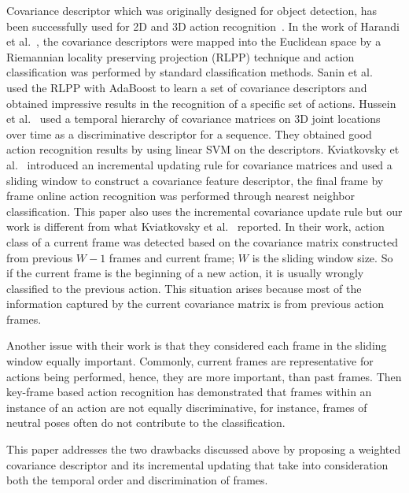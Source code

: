\documentclass[sigconf]{acmart}
\begin{document}
Covariance descriptor which was originally designed for object detection, has been successfully used for 2D and 3D action recognition~\cite{harandi2012kernel,hussein2013human,kviatkovsky2014online,sanin2013spatio}. In the work of Harandi et al.~\cite{harandi2012kernel}, the covariance descriptors were mapped into the Euclidean space by a Riemannian locality preserving projection (RLPP) technique and action classification was performed by standard classification methods. Sanin et al.~\cite{sanin2013spatio} used the RLPP with AdaBoost to learn a set of covariance descriptors and obtained impressive results in the recognition of a specific set of actions. Hussein et al.~\cite{hussein2013human} used a temporal hierarchy of covariance matrices on 3D joint locations over time as a discriminative descriptor for a sequence. They obtained good action recognition results by using linear SVM on the descriptors. Kviatkovsky et al.~\cite{kviatkovsky2014online} introduced an incremental updating rule for covariance matrices and used a sliding window to construct a covariance feature descriptor, the final frame by frame online action recognition was performed through nearest neighbor classification. This paper also uses the incremental covariance update rule but our work is different from what Kviatkovsky et al.~\cite{kviatkovsky2014online} reported. In their work, action class of a current frame was detected based on the covariance matrix constructed from previous $W-1$ frames and current frame; $W$ is the sliding window size. So if the current frame is the beginning of a new action, it is usually wrongly classified to the previous action. This situation arises because most of the information captured by the current covariance matrix is from previous action frames.

Another issue with their work is that they considered each frame in the sliding window equally important. Commonly,  current frames are representative for actions being performed, hence, they are more important, than past frames. Then key-frame based action recognition has demonstrated that frames within an instance of an action are not equally discriminative, for instance, frames of neutral poses often do not contribute to the classification.

This paper addresses the two drawbacks discussed above by proposing a weighted covariance descriptor and its incremental updating that take into consideration both the temporal order and discrimination of frames.
\end{document}
